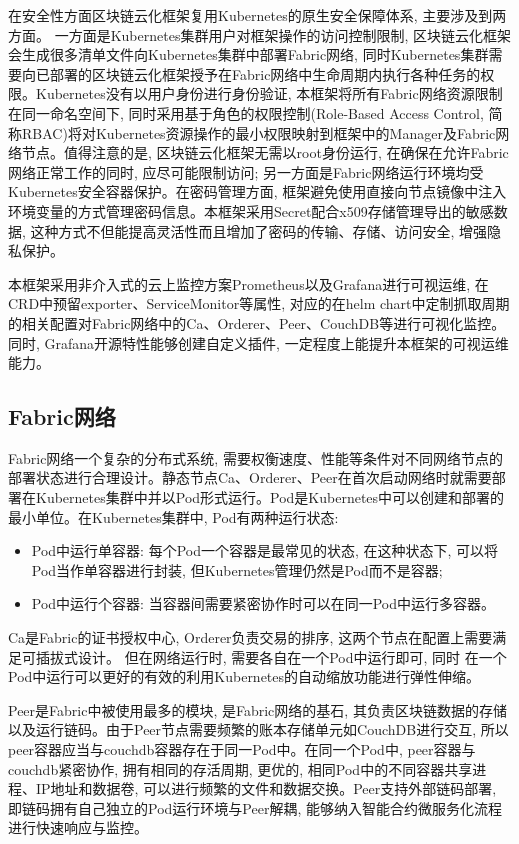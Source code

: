 在安全性方面区块链云化框架复用Kubernetes的原生安全保障体系, 主要涉及到两方面。 一方面是Kubernetes集群用户对框架操作的访问控制限制, 区块链云化框架会生成很多清单文件向Kubernetes集群中部署Fabric网络, 同时Kubernetes集群需要向已部署的区块链云化框架授予在Fabric网络中生命周期内执行各种任务的权限。Kubernetes没有以用户身份进行身份验证, 本框架将所有Fabric网络资源限制在同一命名空间下, 同时采用基于角色的权限控制(Role-Based Access Control, 简称RBAC)将对Kubernetes资源操作的最小权限映射到框架中的Manager及Fabric网络节点。值得注意的是, 区块链云化框架无需以root身份运行, 在确保在允许Fabric网络正常工作的同时, 应尽可能限制访问; 另一方面是Fabric网络运行环境均受Kubernetes安全容器保护。在密码管理方面, 框架避免使用直接向节点镜像中注入环境变量的方式管理密码信息。本框架采用Secret配合x509\cite{8249485}存储管理导出的敏感数据, 这种方式不但能提高灵活性而且增加了密码的传输、存储、访问安全, 增强隐私保护。


本框架采用非介入式的云上监控方案Prometheus以及Grafana进行可视运维, 在CRD中预留exporter、ServiceMonitor等属性, 对应的在helm chart中定制抓取周期的相关配置对Fabric网络中的Ca、Orderer、Peer、CouchDB等进行可视化监控。同时, Grafana开源特性能够创建自定义插件, 一定程度上能提升本框架的可视运维能力。


\subsection{Fabric网络}

Fabric网络一个复杂的分布式系统, 需要权衡速度、性能等条件对不同网络节点的部署状态进行合理设计。静态节点Ca、Orderer、Peer在首次启动网络时就需要部署在Kubernetes集群中并以Pod形式运行。Pod是Kubernetes中可以创建和部署的最小单位。在Kubernetes集群中, Pod有两种运行状态:

\begin{itemize}[itemindent=2em]
    \item Pod中运行单容器: 每个Pod一个容器是最常见的状态, 在这种状态下, 可以将Pod当作单容器进行封装, 但Kubernetes管理仍然是Pod而不是容器;

    \item Pod中运行个容器: 当容器间需要紧密协作时可以在同一Pod中运行多容器。
\end{itemize}

Ca是Fabric的证书授权中心, Orderer负责交易的排序, 这两个节点在配置上需要满足可插拔式设计。 但在网络运行时, 需要各自在一个Pod中运行即可, 同时 在一个Pod中运行可以更好的有效的利用Kubernetes的自动缩放功能进行弹性伸缩。

Peer是Fabric中被使用最多的模块, 是Fabric网络的基石, 其负责区块链数据的存储以及运行链码。由于Peer节点需要频繁的账本存储单元如CouchDB进行交互, 所以peer容器应当与couchdb容器存在于同一Pod中。在同一个Pod中, peer容器与couchdb紧密协作, 拥有相同的存活周期, 更优的, 相同Pod中的不同容器共享进程、IP地址和数据卷, 可以进行频繁的文件和数据交换。Peer支持外部链码部署, 即链码拥有自己独立的Pod运行环境与Peer解耦, 能够纳入智能合约微服务化流程\cite{zhangfuli2021smartcontract}进行快速响应与监控。 

